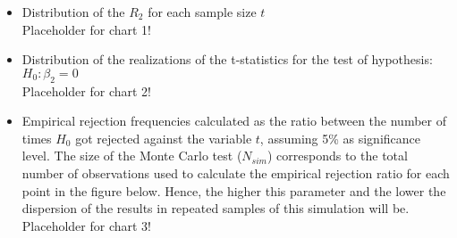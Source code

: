 \documentclass[12pt]{article}
\begin{document}
	\begin{itemize}
		\item Distribution of the $R_2$ for each sample size $t$ \\
		Placeholder for chart 1! 
		\item Distribution of the realizations of the t-statistics for the test of hypothesis: $H_0: \beta_2 =0$ \\
		Placeholder for chart 2!
		\item Empirical rejection frequencies calculated as the ratio between the number of times $H_0$ got rejected against the variable $t$, assuming 5\% as significance level. The size of the Monte Carlo test ($N_{sim}$) corresponds to the total number of observations used to calculate the empirical rejection ratio for each point in the figure below. Hence, the higher this parameter and the lower the dispersion of the results in repeated samples of this simulation will be. \\  
		Placeholder for chart 3!
	\end{itemize}
\end{document}
